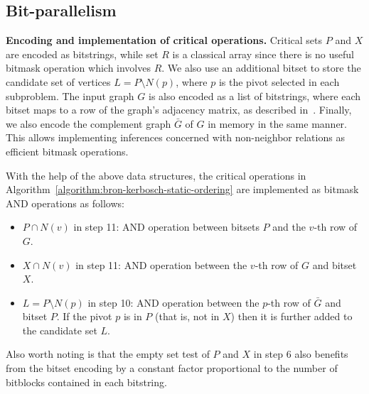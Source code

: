 \documentclass[final,1p]{elsarticle-modified}
\renewcommand{\paragraph}[1]{\medskip\noindent\textbf{#1.}}
\begin{document}

\subsection{Bit-parallelism}

\paragraph{Encoding and implementation of critical operations}
Critical sets $P$ and $X$ are encoded as bitstrings, while set $R$ is a classical array since there is no useful bitmask operation which involves $R$. We also use an additional bitset to store the candidate set of vertices $L=P\setminus N(p)$, where $p$ is the pivot selected in each subproblem. The input graph $G$ is also encoded as a list of bitstrings, where each bitset maps to a row of the graph's adjacency matrix, as described in~\cite{segundo-bitboard-2011,segundo-recoloring}. Finally, we also encode the complement graph $\bar{G}$ of $G$ in memory in the same manner. This allows implementing inferences concerned with non-neighbor relations as efficient bitmask operations. 

With the help of the above data structures, the critical operations in Algorithm~\ref{algorithm:bron-kerbosch-static-ordering} are implemented as bitmask AND operations as follows:
\begin{itemize}
\item $P\cap N(v)$ in step 11: AND operation between bitsets $P$ and the $v$-th row of $G$.
\item $X\cap N(v)$ in step 11: AND operation between the $v$-th row of $G$ and bitset $X$.
\item $L=P\setminus N(p)$ in step 10: AND operation between the $p$-th row of $\bar{G}$ and bitset $P$. If the pivot $p$ is in $P$ (that is, not in $X$) then it is further added to the candidate set $L$.
\end{itemize}

Also worth noting is that the empty set test of $P$ and $X$ in step 6 also benefits from the bitset encoding by a constant factor proportional to the number of bitblocks contained in each bitstring.
\end{document}
